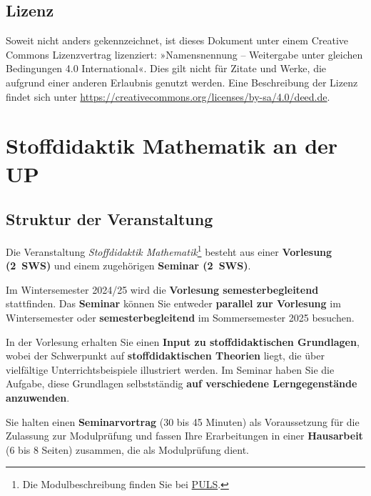 \documentclass[
]{scrbook}
\theoremstyle{definition}
\theoremstyle{definition}
\theoremstyle{definition}
\theoremstyle{definition}
\theoremstyle{remark}
\begin{document}
\section*{Lizenz}\label{lizenz}

Soweit nicht anders gekennzeichnet, ist dieses Dokument unter einem Creative Commons Lizenzvertrag lizenziert: »Namensnennung -- Weitergabe unter gleichen Bedingungen 4.0 International«. Dies gilt nicht für Zitate und Werke, die aufgrund einer anderen Erlaubnis genutzt werden.
Eine Beschreibung der Lizenz findet sich unter \url{https://creativecommons.org/licenses/by-sa/4.0/deed.de}.

\chapter*{Stoffdidaktik Mathematik an der UP}\label{stoffdidaktik-mathematik-an-der-up}

\section*{Struktur der Veranstaltung}\label{struktur-der-veranstaltung}

Die Veranstaltung \emph{Stoffdidaktik Mathematik}\footnote{Die Modulbeschreibung finden Sie bei \href{https://puls.uni-potsdam.de/qisserver/rds?state=verpublish&status=init&vmfile=no&moduleCall=modulansicht&publishConfFile=modulverwaltung&publishSubDir=up/modulbearbeiter&&modul.modul_id=3155&menuid=&topitem=Modulbeschreibung&subitem=}{PULS}.} besteht aus einer \textbf{Vorlesung (2~SWS)} und einem zugehörigen \textbf{Seminar (2~SWS)}.

Im Wintersemester 2024/25 wird die \textbf{Vorlesung semesterbegleitend} stattfinden. Das \textbf{Seminar} können Sie entweder \textbf{parallel zur Vorlesung} im Wintersemester oder \textbf{semesterbegleitend} im Sommersemester 2025 besuchen.

In der Vorlesung erhalten Sie einen \textbf{Input zu stoffdidaktischen Grundlagen}, wobei der Schwerpunkt auf \textbf{stoffdidaktischen Theorien} liegt, die über vielfältige Unterrichtsbeispiele illustriert werden. Im Seminar haben Sie die Aufgabe, diese Grundlagen selbstständig \textbf{auf verschiedene Lerngegenstände anzuwenden}.

Sie halten einen \textbf{Seminarvortrag} (30 bis 45 Minuten) als Voraussetzung für die Zulassung zur Modulprüfung und fassen Ihre Erarbeitungen in einer \textbf{Hausarbeit} (6 bis 8 Seiten) zusammen, die als Modulprüfung dient.
\end{document}
